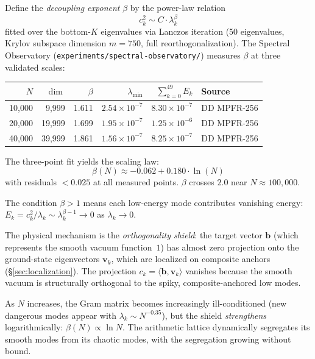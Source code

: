 \documentclass[11pt,a4paper]{article}
\begin{document}
\begin{correspondence}
\label{corr:decoupling}
Define the \emph{decoupling exponent} $\beta$ by the power-law relation
\[
  c_k^2 \sim C \cdot \lambda_k^\beta
\]
fitted over the bottom-$K$ eigenvalues via Lanczos iteration
(50 eigenvalues, Krylov subspace dimension $m = 750$, full
reorthogonalization). The Spectral Observatory
(\texttt{experiments/spectral-observatory/}) measures $\beta$ at
three validated scales:

\begin{center}
\small
\begin{tabular}{@{}rrrrrl@{}}
\toprule
$N$ & $\dim$ & $\beta$ & $\lambda_{\min}$ & $\sum_{k=0}^{49} E_k$ & Source \\
\midrule
10{,}000  & 9{,}999  & 1.611 & $2.54 \times 10^{-7}$ & $8.30 \times 10^{-7}$ & DD MPFR-256 \\
20{,}000  & 19{,}999 & 1.699 & $1.95 \times 10^{-7}$ & $1.25 \times 10^{-6}$ & DD MPFR-256 \\
40{,}000  & 39{,}999 & 1.861 & $1.56 \times 10^{-7}$ & $8.25 \times 10^{-7}$ & DD MPFR-256 \\
\bottomrule
\end{tabular}
\end{center}

The three-point fit yields the scaling law:
\begin{equation}
  \beta(N) \approx -0.062 + 0.180 \cdot \ln(N)
  \label{eq:beta-scaling}
\end{equation}
with residuals $< 0.025$ at all measured points.
$\beta$ crosses $2.0$ near $N \approx 100{,}000$.
\end{correspondence}

\begin{principle}
\label{princ:shield}
The condition $\beta > 1$ means each low-energy mode contributes
vanishing energy: $E_k = c_k^2/\lambda_k \sim \lambda_k^{\beta - 1} \to 0$
as $\lambda_k \to 0$.

The physical mechanism is the \emph{orthogonality shield}: the target
vector $\mathbf{b}$ (which represents the smooth vacuum function~$1$)
has almost zero projection onto the ground-state eigenvectors
$\mathbf{v}_k$, which are localized on composite anchors
(\S\ref{sec:localization}). The projection $c_k = \langle \mathbf{b},
\mathbf{v}_k \rangle$ vanishes because the smooth vacuum is
structurally orthogonal to the spiky, composite-anchored low modes.

As $N$ increases, the Gram matrix becomes increasingly ill-conditioned
(new dangerous modes appear with $\lambda_k \sim N^{-0.35}$), but
the shield \emph{strengthens} logarithmically: $\beta(N) \propto \ln N$.
The arithmetic lattice dynamically segregates its smooth modes from its
chaotic modes, with the segregation growing without bound.
\end{principle}
\end{document}
